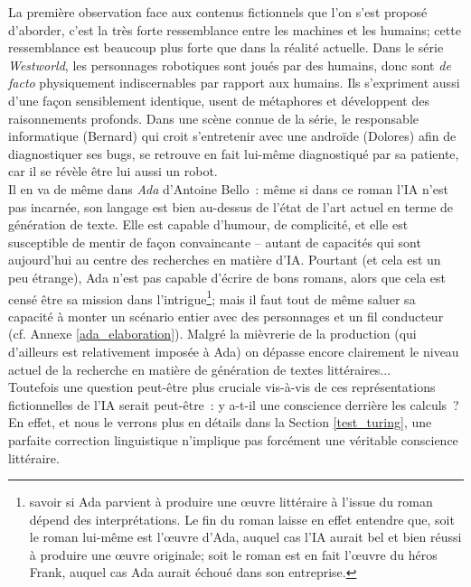 \documentclass{article}
\begin{document}
					La première observation face aux contenus fictionnels que l'on s'est proposé d'aborder, c'est la très forte ressemblance entre les machines et les humains; cette ressemblance est beaucoup plus forte que dans la réalité actuelle. Dans le série \textit{Westworld}, les personnages robotiques sont joués par des humains, donc sont \textit{de facto} physiquement indiscernables par rapport aux humains. Ils s'expriment aussi d'une façon sensiblement identique, usent de métaphores et développent des raisonnements profonds. Dans une scène connue de la série, le responsable informatique (Bernard) qui croit s'entretenir avec une androïde (Dolores) afin de diagnostiquer ses bugs, se retrouve en fait lui-même diagnostiqué par sa patiente, car il se révèle être lui aussi un robot.\\
					
					Il en va de même dans \textit{Ada} d'Antoine Bello~: même si dans ce roman l'IA n'est pas incarnée, son langage est bien au-dessus de l'état de l'art actuel en terme de génération de texte. Elle est capable d'humour, de complicité, et elle est susceptible de mentir de façon convaincante -- autant de capacités qui sont aujourd’hui au centre des recherches en matière d'IA. Pourtant (et cela est un peu étrange), Ada n'est pas capable d'écrire de bons romans, alors que cela est censé être sa mission dans l'intrigue\footnote{savoir si Ada parvient à produire une œuvre littéraire à l'issue du roman dépend des interprétations. Le fin du roman laisse en effet entendre que, soit le roman lui-même est l'œuvre d'Ada, auquel cas l'IA aurait bel et bien réussi à produire une œuvre originale; soit le roman est en fait l'œuvre du héros Frank, auquel cas Ada aurait échoué dans son entreprise.}; mais il faut tout de même saluer sa capacité à monter un scénario entier avec des personnages et un fil conducteur (cf. Annexe \ref{ada_elaboration}). Malgré la mièvrerie de la production (qui d'ailleurs est relativement imposée à Ada) on dépasse encore clairement le niveau actuel de la recherche en matière de génération de textes littéraires...\\
					
					Toutefois une question peut-être plus cruciale vis-à-vis de ces représentations fictionnelles de l'IA serait peut-être~: y a-t-il une conscience derrière les calculs~? En effet, et nous le verrons plus en détails dans la Section \ref{test_turing}, une parfaite correction linguistique n'implique pas forcément une véritable conscience littéraire.\\
					
\end{document}
